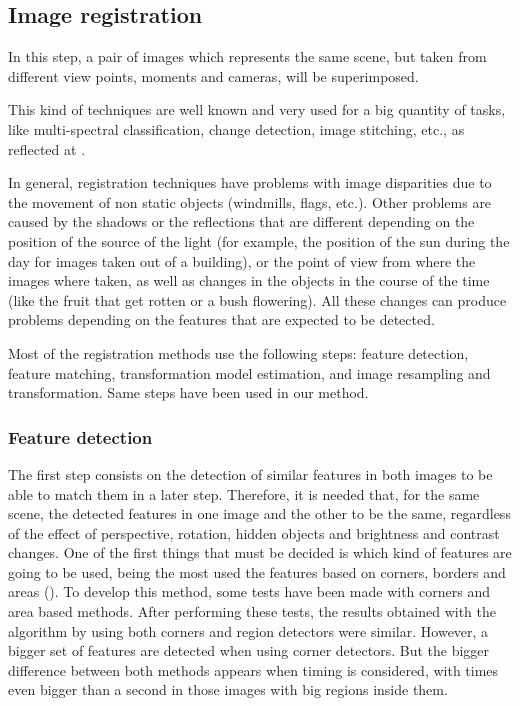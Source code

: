 \subsection{Image registration}\label{ch:chapter02_01_02}

In this step, a pair of images which represents the same scene, but taken from different view points, moments and cameras, will be superimposed.

This kind of techniques are well known and very used for a big quantity of tasks, like multi-spectral classification, change detection, image stitching, etc., as reflected at \cite{kooper2011stitching, singh1996digital, coppin1996digital, radke2005image, zitova2003image}.

In general, registration techniques have problems with image disparities due to the movement of non static objects (windmills, flags, etc.). Other problems are caused by the shadows or the reflections that are different depending on the position of the source of the light (for example, the position of the sun during the day for images taken out of a building), or the point of view from where the images where taken, as well as changes in the objects in the course of the time (like the fruit that get rotten or a bush flowering). All these changes can produce problems depending on the features that are expected to be detected.

Most of the registration methods use the following steps: feature detection, feature matching, transformation model estimation, and image resampling and transformation. Same steps have been used in our method.

\subsubsection{Feature detection}\label{ch:chapter02_01_02_01}

The first step consists on the detection of similar features in both images to be able to match them in a later step. Therefore, it is needed that, for the same scene, the detected features in one image and the other to be the same, regardless of the effect of perspective, rotation, hidden objects and brightness and contrast changes. One of the first things that must be decided is which kind of features are going to be used, being the most used the features based on corners, borders and areas (\cite{li2008comprehensive}). To develop this method, some tests have been made with corners and area based methods. After performing these tests, the results obtained with the algorithm by using both corners and region detectors were similar. However, a bigger set of features are detected when using corner detectors. But the bigger difference between both methods appears when timing is considered, with times even bigger than a second in those images with big regions inside them.

